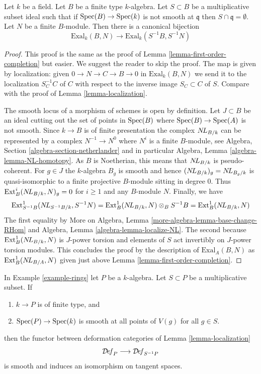 \begin{lemma}
\label{lemma-first-order-localization}
Let $k$ be a field. Let $B$ be a finite type $k$-algebra.
Let $S \subset B$ be a multiplicative subset ideal such that
if $\mathop{\mathrm{Spec}}(B) \to \mathop{\mathrm{Spec}}(k)$ is not smooth at $\mathfrak q$
then $S \cap \mathfrak q = \emptyset$.
Let $N$ be a finite $B$-module.
Then there is a canonical bijection
$$
\text{Exal}_k(B, N) \to \text{Exal}_k(S^{-1}B, S^{-1}N)
$$
\end{lemma}

\begin{proof}
This proof is the same as the proof of
Lemma \ref{lemma-first-order-completion} but easier. We suggest the
reader to skip the proof.
The map is given by localization: given $0 \to N \to C \to B \to 0$
in $\text{Exal}_k(B, N)$ we send it to the localization $S_C^{-1}C$
of $C$ with respect to the inverse image $S_C \subset C$ of $S$.
Compare with the proof of Lemma \ref{lemma-localization}.

\medskip\noindent
The smooth locus of a morphism of schemes is open by definition.
Let $J \subset B$ be an ideal cutting out the set of points
in $\mathop{\mathrm{Spec}}(B)$ where $\mathop{\mathrm{Spec}}(B) \to \mathop{\mathrm{Spec}}(A)$ is not smooth.
Since $k \to B$ is of finite presentation the complex
$\mathop{N\!L}\nolimits_{B/k}$ can be represented by a complex
$N^{-1} \to N^0$ where $N^i$ is a finite $B$-module, see
Algebra, Section \ref{algebra-section-netherlander} and
in particular
Algebra, Lemma \ref{algebra-lemma-NL-homotopy}.
As $B$ is Noetherian, this means that $\mathop{N\!L}\nolimits_{B/k}$
is pseudo-coherent. For $g \in J$ the $k$-algebra $B_g$
is smooth and hence $(\mathop{N\!L}\nolimits_{B/k})_g = \mathop{N\!L}\nolimits_{B_g/k}$
is quasi-isomorphic to a finite projective $B$-module sitting in degree $0$.
Thus $\text{Ext}^i_B(\mathop{N\!L}\nolimits_{B/k}, N)_g = 0$ for $i \geq 1$
and any $B$-module $N$. Finally, we have
$$
\text{Ext}^1_{S^{-1}B}(\mathop{N\!L}\nolimits_{S^{-1}B/k}, S^{-1}N) =
\text{Ext}^1_B(\mathop{N\!L}\nolimits_{B/k}, N) \otimes_B S^{-1}B =
\text{Ext}^1_B(\mathop{N\!L}\nolimits_{B/k}, N)
$$
The first equality by
More on Algebra, Lemma \ref{more-algebra-lemma-base-change-RHom}
and Algebra, Lemma \ref{algebra-lemma-localize-NL}.
The second because $\text{Ext}^1_B(\mathop{N\!L}\nolimits_{B/k}, N)$ is $J$-power
torsion and elements of $S$ act invertibly on $J$-power torsion modules.
This concludes the proof by the description of $\text{Exal}_A(B, N)$
as $\text{Ext}^1_B(\mathop{N\!L}\nolimits_{B/A}, N)$ given just above
Lemma \ref{lemma-first-order-completion}.
\end{proof}

\begin{lemma}
\label{lemma-smooth-localization}
In Example \ref{example-rings} let $P$ be a $k$-algebra.
Let $S \subset P$ be a multiplicative subset. If
\begin{enumerate}
\item $k \to P$ is of finite type, and
\item $\mathop{\mathrm{Spec}}(P) \to \mathop{\mathrm{Spec}}(k)$ is smooth at all points of
$V(g)$ for all $g \in S$.
\end{enumerate}
then the functor between deformation categories of
Lemma \ref{lemma-localization}
$$
\mathcal{D}\!\mathit{ef}_P \longrightarrow \mathcal{D}\!\mathit{ef}_{S^{-1}P}
$$
is smooth and induces an isomorphism on tangent spaces.
\end{lemma}


